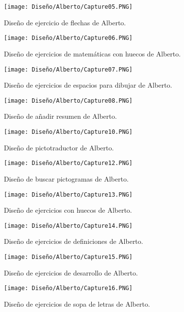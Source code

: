 \begin{figure}[ht!]
  \centering
\texttt{[image: Diseño/Alberto/Capture05.PNG]}
  \caption{Diseño de ejercicio de flechas de Alberto.}
\end{figure}

\begin{figure}[ht!]
  \centering
\texttt{[image: Diseño/Alberto/Capture06.PNG]}
  \caption{Diseño de ejercicios de matemáticas con huecos de Alberto.}
\end{figure}

\begin{figure}[ht!]
  \centering
\texttt{[image: Diseño/Alberto/Capture07.PNG]}
  \caption{Diseño de ejercicios de espacios para dibujar de Alberto.}
\end{figure}

\begin{figure}[ht!]
  \centering
\texttt{[image: Diseño/Alberto/Capture08.PNG]}
  \caption{Diseño de añadir resumen de Alberto.}
\end{figure}

\begin{figure}[ht!]
  \centering
\texttt{[image: Diseño/Alberto/Capture10.PNG]}
  \caption{Diseño de pictotraductor de Alberto.}
\end{figure}

\begin{figure}[ht!]
  \centering
\texttt{[image: Diseño/Alberto/Capture12.PNG]}
  \caption{Diseño de buscar pictogramas de Alberto.}
\end{figure}

\begin{figure}[ht!]
  \centering
\texttt{[image: Diseño/Alberto/Capture13.PNG]}
  \caption{Diseño de ejercicios con huecos de Alberto.}
\end{figure}

\begin{figure}[ht!]
  \centering
\texttt{[image: Diseño/Alberto/Capture14.PNG]}
  \caption{Diseño de ejercicios de definiciones de Alberto.}
\end{figure}

\begin{figure}[ht!]
  \centering
\texttt{[image: Diseño/Alberto/Capture15.PNG]}
  \caption{Diseño de ejercicios de desarrollo de Alberto.}
\end{figure}

\begin{figure}[ht!]
  \centering
\texttt{[image: Diseño/Alberto/Capture16.PNG]}
  \caption{Diseño de ejercicios de sopa de letras de Alberto.}
\end{figure}

